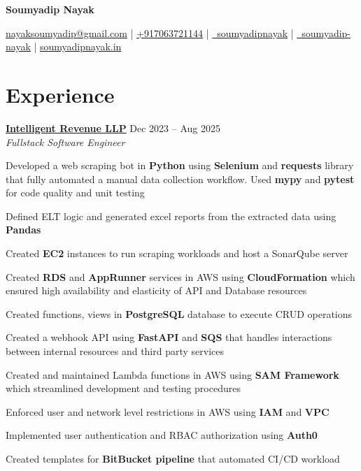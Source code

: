 \documentclass[a4paper,10pt]{article}
\begin{document}
\begin{center}
{\LARGE \textbf{Soumyadip Nayak}}



\href{mailto:nayaksoumyadip@gmail.com}{nayaksoumyadip@gmail.com}
 | 
\href{tel:+917063721144}{+917063721144}
 | 
\href{https://github.com/soumyadipnayak}{\faGithub\ soumyadipnayak}
 |
\href{https://www.linkedin.com/in/soumyadip-nayak/}{\faLinkedin\ soumyadip-nayak}
 | 
\href{https://www.soumyadipnayak.in}{soumyadipnayak.in}
\end{center}

\section*{Experience}
\textbf{\href{https://www.intellirevenue.com}{Intelligent Revenue LLP}} \hfill Dec 2023 -- Aug 2025\\
\textit{Fullstack Software Engineer}
\begin{experiencelist}
\item Developed a web scraping bot in \textbf{Python} using \textbf{Selenium} and \textbf{requests} library that fully automated a manual data collection workflow. Used \textbf{mypy} and \textbf{pytest} for code quality and unit testing
\item Defined ELT logic and generated excel reports from the extracted data using \textbf{Pandas}
\item Created \textbf{EC2} instances to run scraping workloads and host a SonarQube server
\item Created \textbf{RDS} and \textbf{AppRunner} services in AWS using \textbf{CloudFormation} which ensured high availability and elasticity of API and Database resources
\item Created functions, views in \textbf{PostgreSQL} database to execute CRUD operations
\item Created a webhook API using \textbf{FastAPI} and \textbf{SQS} that handles interactions between internal resources and third party services
\item Created and maintained Lambda functions in AWS using \textbf{SAM Framework} which streamlined development and testing procedures
\item Enforced user and network level restrictions in AWS using \textbf{IAM} and \textbf{VPC}
\item Implemented user authentication and RBAC authorization using \textbf{Auth0}
\item Created templates for \textbf{BitBucket pipeline} that automated CI/CD workload
\end{experiencelist}
\end{document}
